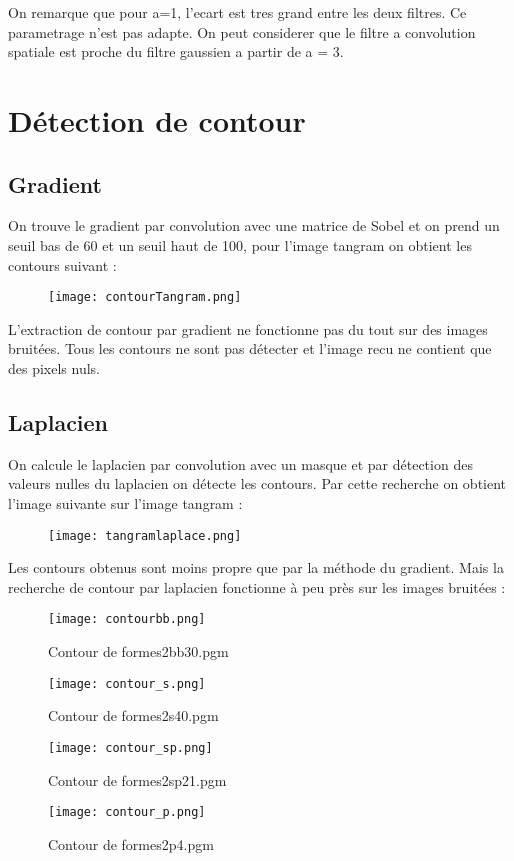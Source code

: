 \documentclass{article}
\begin{document}
On remarque que pour a=1, l'ecart est tres grand entre les deux filtres. Ce parametrage n'est pas adapte.
On peut considerer que le filtre a convolution spatiale est proche du filtre gaussien a partir de a = 3.

\section{Détection de contour}

\subsection{Gradient}
On trouve le gradient par convolution avec une matrice de Sobel et on prend un seuil bas de 60 et un seuil haut de 100, pour l'image tangram on obtient les contours suivant :

\begin{figure}[h]
\texttt{[image: contourTangram.png]}

\end{figure}
\bigbreak
\bigbreak
\bigbreak
\bigbreak
\bigbreak
\bigbreak
\bigbreak
\bigbreak
\bigbreak
\bigbreak
\bigbreak
L'extraction de contour par gradient ne fonctionne pas du tout sur des images bruitées. Tous les contours ne sont pas détecter et l'image recu ne contient que des pixels nuls.

\subsection{Laplacien}

On calcule le laplacien par convolution avec un masque et par détection des valeurs nulles du laplacien on détecte les contours. Par cette recherche on obtient l'image suivante sur l'image tangram :
\begin{figure}[h]
\texttt{[image: tangramlaplace.png]}
\end{figure}

Les contours obtenus sont moins propre que par la méthode du gradient. Mais la recherche de contour par laplacien fonctionne à peu près sur les images bruitées :


\begin{figure}[h]
\texttt{[image: contourbb.png]}
\caption{Contour de formes2bb30.pgm}
\end{figure}

\begin{figure}[h]
\texttt{[image: contour\_s.png]}
\caption{Contour de formes2s40.pgm}
\end{figure}
\begin{figure}[h]
\texttt{[image: contour\_sp.png]}
\caption{Contour de formes2sp21.pgm}
\end{figure}
\begin{figure}[h]
\texttt{[image: contour\_p.png]}
\caption{Contour de formes2p4.pgm}
\end{figure}
\end{document}

